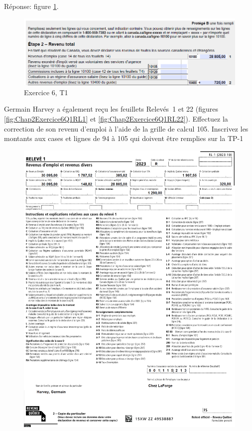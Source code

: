 Réponse: figure \ref{fig:Chap2Exercice6Q1aReponse}.
\begin{figure}
	\centering
	\includegraphics[width=.9\textwidth]{exercice/2-6/Q1/a-reponse.png}
	\caption[]{Exercice 6, T1}
	\label{fig:Chap2Exercice6Q1aReponse}
\end{figure}

\begin{sousQuestion}
	Germain Harvey a également reçu les feuillets Relevés~1 et 22 (figures \ref{fig:Chap2Exercice6Q1RL1} et \ref{fig:Chap2Exercice6Q1RL22}). Effectuez la correction de son revenu d'emploi à l'aide de la grille de calcul 105. Inscrivez les montants aux cases et lignes de 94 à 105 qui doivent être remplies sur la TP-1
	\begin{figure}
		\centering
		\includegraphics[width=.9\textwidth]{exercice/2-6/Q1/b-RL1.png}

\end{figure}
\end{sousQuestion}
